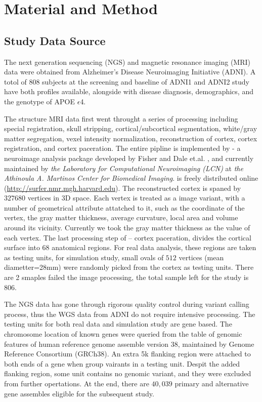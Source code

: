 \section{Material and Method}

\subsection{Study Data Source}
The next generation sequencing (NGS) and magnetic resonance imaging (MRI) data were obtained from Alzheimer’s Disease Neuroimaging Initiative (ADNI). A totol of 808 subjects at the screening and baseline of ADNI1 and ADNI2 study have both profiles available, alongside with disease diagnosis, demographics, and the genotype of APOE $\epsilon$4. 

The structure MRI data first went throught a series of processing including special registration, skull stripping, cortical/subcortical segmentation, white/gray matter segregation, vexel intensity normalization, reconstruction of cortex, cortex registration, and cortex paceration. The entire pipline is implemented by \FS - a neuroimage analysis package developed by Fisher and Dale et.al. \cite{FS:Intro}, and currently maintained by \textit{the Laboratory for Computational Neuroimaging (LCN)}  at \textit {the Athinoula A. Martinos Center for Biomedical Imaging}. \FS is freely distributed online (\url{http://surfer.nmr.mgh.harvard.edu}). The reconstructed cortex is spaned by $327680$ vertices in 3D space. Each vertex is treated as a image variant, with a number of geometrical attribute attatched to it, such as the coordinate of the vertex, the gray matter thickness, average curvature, local area and volume around its vicinity. Currently we took the gray matter thickness as the value of each vertex. The last processing step of \FS -- cortex paceration, divides the cortical surface into 68 anatomical regions. For real data analysis, these regions are taken as testing units, for simulation study, small ovals of $512$ vertices (mean diametter=28mm) were randomly picked from the cortex as testing units. There are 2 smaples failed the image processing, the total sample left for the study is 806.

The NGS data has gone through rigorous quality control during variant calling process, thus the WGS data from ADNI do not require intensive processing. The testing units for both real data and simulation study are gene based. The chromosome location of known genes were queried from the table of genomic features of human reference genome assemble version 38, maintained by Genome Reference Consortium (GRCh38). An extra 5k flanking region were attached to both ends of a gene when group vairants in a testing unit. Despit the added flanking region, some unit contains no genomic variant, and they were excluded from further opertations. At the end, there are $40,039$ primary and alternative gene assembles eligible for the subsequent study.

